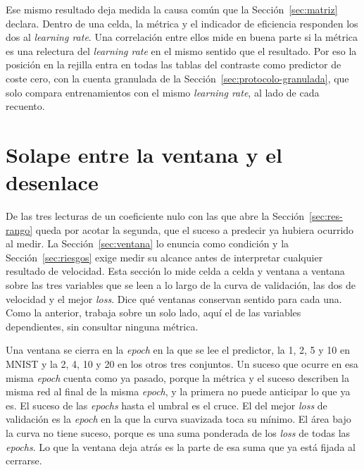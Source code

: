 Ese mismo resultado deja medida la causa común que la Sección~\ref{sec:matriz} declara. Dentro de una celda, la métrica y el indicador de eficiencia responden los dos al \emph{learning rate}. Una correlación entre ellos mide en buena parte si la métrica es una relectura del \emph{learning rate} en el mismo sentido que el resultado. Por eso la posición en la rejilla entra en todas las tablas del contraste como predictor de coste cero, con la cuenta granulada de la Sección~\ref{sec:protocolo-granulada}, que solo compara entrenamientos con el mismo \emph{learning rate}, al lado de cada recuento.

\section{Solape entre la ventana y el desenlace}
\label{sec:res-solape}

De las tres lecturas de un coeficiente nulo con las que abre la Sección~\ref{sec:res-rango} queda por acotar la segunda, que el suceso a predecir ya hubiera ocurrido al medir. La Sección~\ref{sec:ventana} lo enuncia como condición y la Sección~\ref{sec:riesgos} exige medir su alcance antes de interpretar cualquier resultado de velocidad. Esta sección lo mide celda a celda y ventana a ventana sobre las tres variables que se leen a lo largo de la curva de validación, las dos de velocidad y el mejor \emph{loss}. Dice qué ventanas conservan sentido para cada una. Como la anterior, trabaja sobre un solo lado, aquí el de las variables dependientes, sin consultar ninguna métrica.

Una ventana se cierra en la \emph{epoch} en la que se lee el predictor, la 1, 2, 5 y 10 en MNIST y la 2, 4, 10 y 20 en los otros tres conjuntos. Un suceso que ocurre en esa misma \emph{epoch} cuenta como ya pasado, porque la métrica y el suceso describen la misma red al final de la misma \emph{epoch}, y la primera no puede anticipar lo que ya es. El suceso de las \emph{epochs} hasta el umbral es el cruce. El del mejor \emph{loss} de validación es la \emph{epoch} en la que la curva suavizada toca su mínimo. El área bajo la curva no tiene suceso, porque es una suma ponderada de los \emph{loss} de todas las \emph{epochs}. Lo que la ventana deja atrás es la parte de esa suma que ya está fijada al cerrarse.

